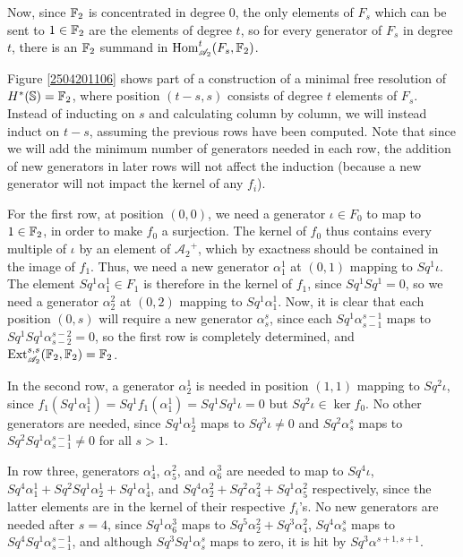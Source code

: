 \documentclass{MetricNotes2023}
\def\bb{\ensuremath\mathbb}
\def\A{\ensuremath{\mathscr{A}_2}}
\DeclareMathOperator{\Ext}{Ext}
\DeclareMathOperator{\Hom}{Hom}
\begin{document}
Now, since \(\bb{F}_2\) is concentrated in degree 0, the only elements of \(F_s\) which can be sent to \(1 \in \bb{F}_2\) are the elements of degree \(t\), so for every generator of \(F_s\) in degree \(t\), there is an \(\bb{F}_2\) summand in \(\Hom^t_{\A}(F_s, \bb{F}_2)\). 

Figure \ref{2504201106} shows part of a construction of a minimal free resolution of \(H^*(\bb{S})=\bb{F}_2\), where position \((t-s, s)\) consists of degree \(t\) elements of \(F_s\).  Instead of inducting on \(s\) and calculating column by column, we will instead induct on \(t-s\), assuming the previous rows have been computed. Note that since we will add the minimum number of generators needed in each row, the addition of new generators in later rows will not affect the induction (because a new generator will not impact the kernel of any \(f_i\)). 

For the first row, at position \((0,0)\), we need a generator \(\iota\in F_0\) to map to \(1 \in \bb{F}_2\), in order to make \(f_0\) a surjection. The kernel of \(f_0\) thus contains every multiple of \(\iota\) by an element of \(\A^+\), which by exactness should be contained in the image of \(f_1\). Thus, we need a new generator \(\alpha^1_1\) at \((0,1)\) mapping to \(Sq^1\iota\). The element \(Sq^1\alpha^1_1\in F_1\) is therefore in the kernel of \(f_1\), since \(Sq^1Sq^1=0\), so we need a generator \(\alpha^2_2\) at \((0,2)\) mapping to \(Sq^1\alpha^1_1\). Now, it is clear that each position \((0,s)\) will require a new generator \(\alpha^s_s\), since each \(Sq^1\alpha^{s-1}_{s-1}\) maps to \(Sq^1Sq^1 \alpha^{s-2}_{s-2}=0\), so the first row is completely determined, and \(\Ext^{s,s}_{\A}(\bb{F}_2, \bb{F}_2)=\bb{F}_2\). 

In the second row, a generator \(\alpha^1_2\) is needed in position \((1,1)\) mapping to \(Sq^2\iota\), since \(f_1(Sq^1\alpha^1_1)=Sq^1f_1(\alpha^1_1)=Sq^1
Sq^1\iota=0\) but \(Sq^2\iota\in \ker f_0\). No other generators are needed, since \(Sq^1\alpha^1_2\) maps to \(Sq^3\iota\neq 0\) and \(Sq^2\alpha^s_s\) maps to \(Sq^2Sq^1\alpha^{s-1}_{s-1}\neq 0\) for all \(s>1\).

In row three, generators \(\alpha^1_4\), \(\alpha^2_5\), and \(\alpha^3_6\) are needed to map to \(Sq^4\iota\), \(Sq^4\alpha^1_1+Sq^2Sq^1\alpha^1_2+Sq^1 \alpha^1_4\), and \(Sq^4\alpha^2_2+Sq^2\alpha^2_4+Sq^1\alpha^2_5\) respectively, since the latter elements are in the kernel of their respective \(f_i\)'s. No new generators are needed after \(s=4\), since \(Sq^1\alpha^3_6\) maps to \(Sq^5\alpha^2_2+Sq^3\alpha^2_4\), \(Sq^4\alpha^s_s\) maps to \(Sq^4Sq^1\alpha^{s-1}_{s-1}\), and although \(Sq^3Sq^1\alpha^s_s\) maps to zero, it is hit by \(Sq^3\alpha^{s+1,s+1}\). 
\end{document}
